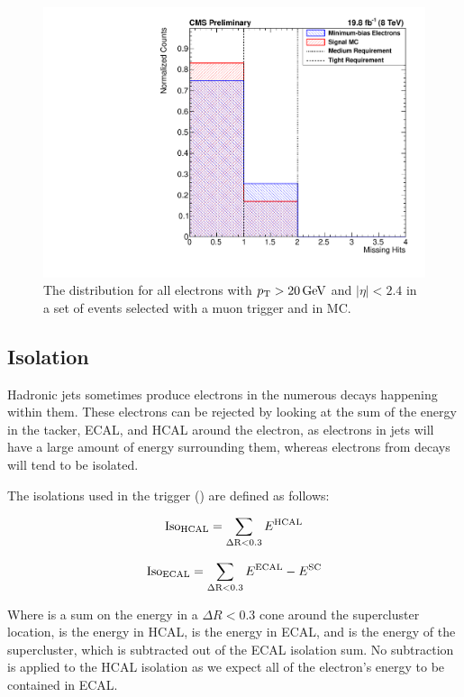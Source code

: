 \begin{figure}[!htbp]
    \centering
    \includegraphics[width=\StackedPlotWidth]{figures/e_reco_var_nmiss.pdf}
    \caption[
        Distributions of \nmiss in data and MC.
    ]{
        The \nmiss distribution for all electrons with $p_{\mathrm{T}} > 20 \,\text{Ge\hspace{-.08em}V}$ and
        $|\eta| < 2.4$ in a set of events selected with a muon trigger and in
        \MADGRAPH \Ztoee MC.
    }
    \label{fig:nmiss}
\end{figure}

\subsection{Isolation}

Hadronic jets sometimes produce electrons in the numerous decays happening
within them. These electrons can be rejected by looking at the sum of the
energy in the tacker, ECAL, and HCAL around the electron, as electrons in jets
will have a large amount of energy surrounding them, whereas electrons from \Z
decays will tend to be isolated.

The isolations used in the trigger (\SingleElectronTrigger) are defined as
follows:

\begin{equation}
    \text{Iso}_{\text{HCAL}} = \sum_{\Delta \text{R}<0.3} E^{\text{HCAL}}
\end{equation}

\begin{equation}
    \text{Iso}_{\text{ECAL}} = \sum_{\Delta \text{R}<0.3} E^{\text{ECAL}} - E^{\text{SC}}
\end{equation}

Where \DeltaRSum is a sum on the energy in a $\Delta R < 0.3$ cone around the
supercluster location, \EHCAL is the energy in HCAL, \EECAL is the energy in
ECAL, and \ESC is the energy of the supercluster, which is subtracted out of
the ECAL isolation sum. No subtraction is applied to the HCAL isolation as we
expect all of the electron's energy to be contained in ECAL.

